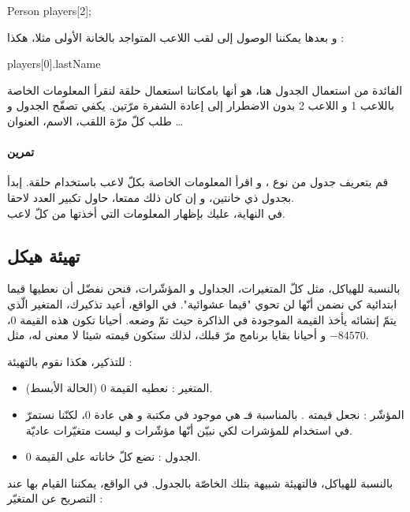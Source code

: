 \begin{Csource}
Person players[2];
\end{Csource}

و بعدها يمكننا الوصول إلى لقب اللاعب المتواجد بالخانة الأولى مثلا، هكذا :

\begin{Console}
players[0].lastName
\end{Console}

الفائدة من استعمال الجدول هنا، هو أنها بامكاننا استعمال حلقة لنقرأ المعلومات الخاصة باللاعب 1 و اللاعب 2 بدون الاضطرار إلى إعادة الشفرة مرّتين. يكفي تصفّح الجدول
و طلب كلّ مرّة اللقب، الاسم، العنوان \dots

\paragraph{تمرين}
قم بتعريف جدول من نوع
،
و اقرأ المعلومات الخاصة بكلّ لاعب باستخدام حلقة. إبدأ بجدول ذي خانتين، و إن كان ذلك ممتعا، حاول تكبير العدد لاحقا.\\
في النهاية، عليك بإظهار المعلومات التي أخذتها من كلّ لاعب.

\subsection{تهيئة هيكل}

بالنسبة للهياكل، مثل كلّ المتغيرات، الجداول و المؤشّرات، فنحن نفضّل أن نعطيها قيما ابتدائية كي نضمن أنّها لن تحوي "قيما عشوائية". في الواقع، أعيد تذكيرك، المتغير الّذي يتمّ إنشائه يأخذ القيمة الموجودة في الذاكرة حيث تمّ وضعه. أحيانا تكون هذه القيمة $ 0 $، و أحيانا بقايا برنامج مرّ قبلك، لذلك ستكون قيمته شيئا لا معنى له، مثل
$-84570$.

للتذكير، هكذا نقوم بالتهيئة :

\begin{itemize}
  \item  المتغير : نعطيه القيمة 0 (الحالة الأبسط).
  \item المؤشّر : نجعل قيمته
.
بالمناسبة فـ
هي
موجود في مكتبة
و هي عادة 0، لكنّنا نستمرّ في استخدام
للمؤشرات لكي نبيّن أنّها مؤشّرات و ليست متغيّرات عاديّة.
  \item الجدول : نضع كلّ خاناته على القيمة 0.
\end{itemize}

بالنسبة للهياكل، فالتهيئة شبيهة بتلك الخاصّة بالجدول. في الواقع، يمكننا القيام بها عند التصريح عن المتغيّر :

